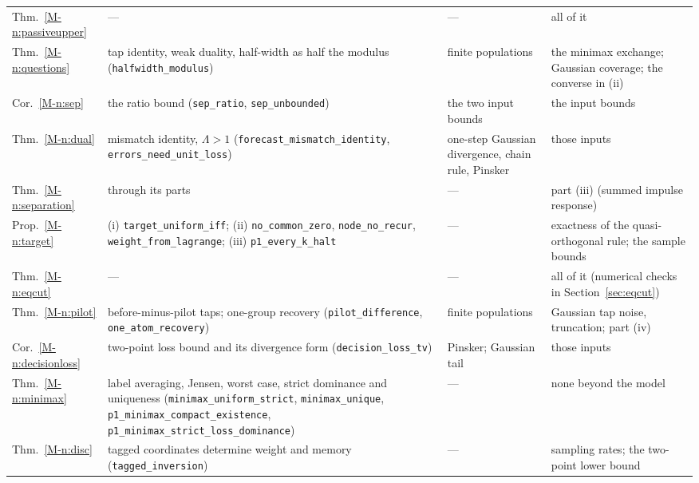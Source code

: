 \documentclass[12pt]{article}
\theoremstyle{definition}
\theoremstyle{remark}
\begin{document}
{\begin{longtable}{>{\raggedright\arraybackslash}p{}>{\raggedright\arraybackslash}p{}>{\raggedright\arraybackslash}p{}>{\raggedright\arraybackslash}p{}}
Thm.~\ref{M-n:passiveupper} & --- & --- & all of it\\
Thm.~\ref{M-n:questions} & tap identity, weak duality, half-width as half the modulus (\texttt{halfwidth\_\allowbreak{}modulus}) & finite populations & the minimax exchange; Gaussian coverage; the converse in (ii)\\
Cor.~\ref{M-n:sep} & the ratio bound (\texttt{sep\_\allowbreak{}ratio}, \texttt{sep\_\allowbreak{}unbounded}) & the two input bounds & the input bounds\\
Thm.~\ref{M-n:dual} & mismatch identity, $\Lambda > 1$ (\texttt{forecast\_\allowbreak{}mismatch\_\allowbreak{}identity}, \texttt{errors\_\allowbreak{}need\_\allowbreak{}unit\_\allowbreak{}loss}) & one-step Gaussian divergence, chain rule, Pinsker & those inputs\\
Thm.~\ref{M-n:separation} & through its parts & --- & part (iii) (summed impulse response)\\
Prop.~\ref{M-n:target} & (i) \texttt{target\_\allowbreak{}uniform\_\allowbreak{}iff}; (ii) \texttt{no\_\allowbreak{}common\_\allowbreak{}zero}, \texttt{node\_\allowbreak{}no\_\allowbreak{}recur}, \texttt{weight\_\allowbreak{}from\_\allowbreak{}lagrange}; (iii) \texttt{p1\_\allowbreak{}every\_\allowbreak{}k\_\allowbreak{}halt} & --- & exactness of the quasi-orthogonal rule; the sample bounds\\
Thm.~\ref{M-n:eqcut} & --- & --- & all of it (numerical checks in Section~\ref{sec:eqcut})\\
Thm.~\ref{M-n:pilot} & before-minus-pilot taps; one-group recovery (\texttt{pilot\_\allowbreak{}difference}, \texttt{one\_\allowbreak{}atom\_\allowbreak{}recovery}) & finite populations & Gaussian tap noise, truncation; part (iv)\\
Cor.~\ref{M-n:decisionloss} & two-point loss bound and its divergence form (\texttt{decision\_\allowbreak{}loss\_\allowbreak{}tv}) & Pinsker; Gaussian tail & those inputs\\
Thm.~\ref{M-n:minimax} & label averaging, Jensen, worst case, strict dominance and uniqueness (\texttt{minimax\_\allowbreak{}uniform\_\allowbreak{}strict}, \texttt{minimax\_\allowbreak{}unique}, \texttt{p1\_\allowbreak{}minimax\_\allowbreak{}compact\_\allowbreak{}existence}, \texttt{p1\_\allowbreak{}minimax\_\allowbreak{}strict\_\allowbreak{}loss\_\allowbreak{}dominance}) & --- & none beyond the model\\
Thm.~\ref{M-n:disc} & tagged coordinates determine weight and memory (\texttt{tagged\_\allowbreak{}inversion}) & --- & sampling rates; the two-point lower bound\\

\end{longtable}}
\end{document}
